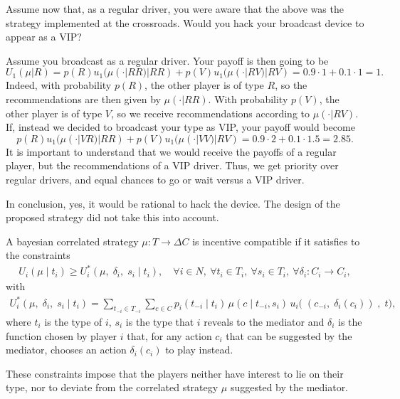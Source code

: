 \begin{example}
Assume now that, as a regular driver, you were aware that the above was the strategy implemented at the crossroads. Would you hack your broadcast device to appear as a VIP?

Assume you broadcast as a regular driver. Your payoff is then going to be
$$ U_1(\mu | R) =  p(R) u_1(\mu(\cdot | RR) | RR) + p(V)  u_1(\mu(\cdot | RV) | RV) = 0.9 \cdot 1 + 0.1 \cdot 1 = 1. $$
Indeed, with probability $p(R)$, the other player is of type $R$, so the recommendations are then given by $\mu(\cdot | RR)$. With probability $p(V)$, the other player is of type $V$, so we receive recommendations according to $\mu(\cdot | RV)$.
If, instead we decided to broadcast your type as VIP, your payoff would become
$$ p(R) u_1(\mu(\cdot | VR) | RR) + p(V)  u_1(\mu(\cdot | VV) | RV) = 0.9 \cdot 2 + 0.1 \cdot 1.5 = 2.85. $$
It is important to understand that we would receive the payoffs of a regular player, but the recommendations of a VIP driver. Thus, we get priority over regular drivers, and equal chances to go or wait versus a VIP driver.


In conclusion, yes, it would be rational to hack the device. The design of the proposed strategy did not take this into account.
\end{example}


\begin{definition}
A bayesian correlated strategy $\mu : T \rightarrow \Delta C$ is incentive compatible if it satisfies to the constraints
\begin{align*}
	U_i(\mu \; | \; t_i) \geq U_i^*(\mu, \; \delta_i, \; s_i \; | \; t_i), \quad \forall i \in N, \ \forall t_i \in T_i, \ \forall s_i \in T_i, \ \forall \delta_i : C_i \rightarrow C_i,
\end{align*}
with
\begin{align*}
	U_i^*(\mu, \; \delta_i, \; s_i \; | \; t_i) = \sum_{t_{-i} \in T_{-i}} \sum_{c \in C} p_i(t_{-i} \; | \; t_i) \, \mu(c \; | \; t_{-i}, s_i) \, u_i\big( \; (c_{-i}, \; \delta_i(c_i)) \;, \; t \big),
\end{align*}
where $t_i$ is the type of $i$, $s_i$ is the type that $i$ reveals to the mediator and $\delta_i$ is the function chosen by player $i$ that, for any action $c_i$ that can be suggested by the mediator, chooses an action $\delta_i(c_i)$ to play instead.
\label{incentiveCompatible}
\end{definition}

These constraints impose that the players neither have interest to lie on their type, nor to deviate from the correlated strategy $\mu$ suggested by the mediator.


